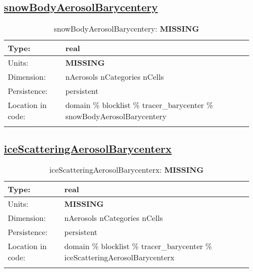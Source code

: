 \subsection[snowBodyAerosolBarycentery]{\hyperref[sec:var_tab_tracer_barycenter]{snowBodyAerosolBarycentery}}
\label{subsec:var_sec_tracer_barycenter_snowBodyAerosolBarycentery}
\begin{center}
\begin{longtable}{| p{2.0in} | p{4.0in} |}
        \hline 
        Type: & real \\
        \hline 
        Units: & {\bf \color{red} MISSING} \\
        \hline 
        Dimension: & nAerosols nCategories nCells \\
        \hline 
        Persistence: & persistent \\
        \hline 
         Location in code: & domain \% blocklist \% tracer\_barycenter \% snowBodyAerosolBarycentery \\
         \hline 
    \caption{snowBodyAerosolBarycentery: {\bf \color{red} MISSING}}
\end{longtable}
\end{center}
\subsection[iceScatteringAerosolBarycenterx]{\hyperref[sec:var_tab_tracer_barycenter]{iceScatteringAerosolBarycenterx}}
\label{subsec:var_sec_tracer_barycenter_iceScatteringAerosolBarycenterx}
\begin{center}
\begin{longtable}{| p{2.0in} | p{4.0in} |}
        \hline 
        Type: & real \\
        \hline 
        Units: & {\bf \color{red} MISSING} \\
        \hline 
        Dimension: & nAerosols nCategories nCells \\
        \hline 
        Persistence: & persistent \\
        \hline 
         Location in code: & domain \% blocklist \% tracer\_barycenter \% iceScatteringAerosolBarycenterx \\
         \hline 
    \caption{iceScatteringAerosolBarycenterx: {\bf \color{red} MISSING}}
\end{longtable}
\end{center}
